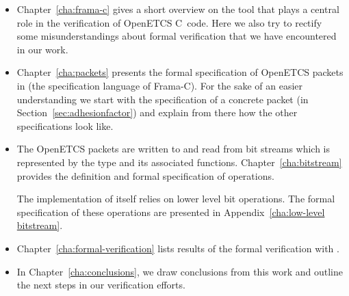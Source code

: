 \begin{itemize}
\item
Chapter~\ref{cha:frama-c} gives a short overview on the \framacwp tool
that plays a central role in the verification of OpenETCS C~code.
Here we also try to rectify some misunderstandings about formal verification
that we have encountered in our work.

\item
Chapter~\ref{cha:packets} presents the formal specification of OpenETCS
packets in \acsl (the specification language of Frama-C).
For the sake of an easier understanding we start with the specification of
a concrete packet (\adhesion in Section~\ref{sec:adhesionfactor})
and explain from there how the other specifications look like.

\item
The OpenETCS packets are written to and read from bit streams which is represented
by the type  and its associated functions.
Chapter~\ref{cha:bitstream} provides the definition and formal specification
of  operations.

The implementation of  itself relies on lower level bit operations.
The formal specification of these operations are presented in Appendix~\ref{cha:low-level bitstream}.

\item 
Chapter~\ref{cha:formal-verification} lists results of the formal verification with \framacwp.

\item
In Chapter~\ref{cha:conclusions}, we draw conclusions from this work
and outline the next steps in our verification efforts.
\end{itemize}

